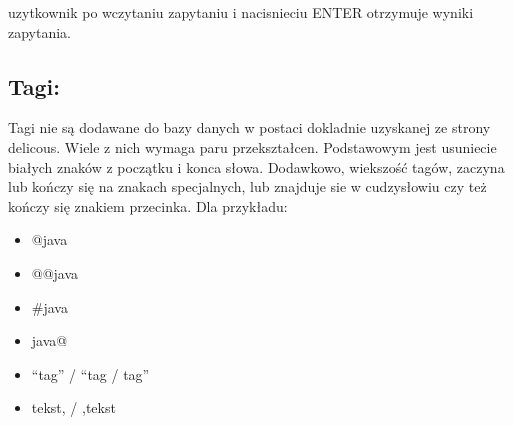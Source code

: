 uzytkownik po wczytaniu zapytaniu i nacisnieciu ENTER otrzymuje wyniki zapytania.


\subsection*{Tagi:}
Tagi nie są dodawane do bazy danych w postaci dokladnie uzyskanej ze strony delicous. Wiele z nich wymaga paru przekształcen. Podstawowym jest usuniecie białych znaków z początku i konca słowa. Dodawkowo, wiekszość tagów, zaczyna lub kończy się na znakach specjalnych, lub znajduje sie w cudzysłowiu czy też kończy się znakiem przecinka. Dla przykładu:

\begin{itemize} 
    \item @java
    \item  @@java
    \item  \#java
    \item  java@
    \item  “tag” / “tag / tag”
    \item  tekst, / ,tekst
\end{itemize}



